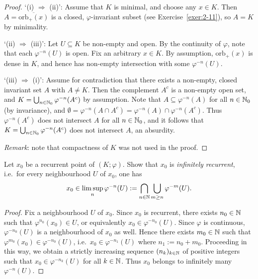 \begin{proof}
	`(i) $\Rightarrow$ (ii)': Assume that $K$ is minimal, and choose any $x\in K$. Then $A = \overline{\mathrm{orb}_+(x)}$ is a closed, $\varphi$-invariant subset (see Exercise~\ref{exer:2-11}), so $A=K$ by minimality.
	
	`(ii) $\Rightarrow$ (iii)': Let $U \subseteq K$ be non-empty and open. By the continuity of $\varphi$, note that each $\varphi^{-n}(U)$ is open. Fix an arbitrary $x\in K$. By assumption, $\mathrm{orb}_+(x)$ is dense in $K$, and hence has non-empty intersection with some $\varphi^{-n}(U)$.
	
	`(iii) $\Rightarrow$ (i)': Assume for contradiction that there exists a non-empty, closed invariant set $A$ with $A \ne K$. Then the complement $A^c$ is a non-empty open set, and $K = \bigcup_{n\in\mathbb{N}_0} \varphi^{-n}(A^c)$ by assumption. Note that $A \subseteq \varphi^{-n}(A)$ for all $n\in\mathbb{N}_0$ (by invariance), and $\emptyset = \varphi^{-n}(A \cap A^c) = \varphi^{-n}(A) \cap \varphi^{-n}(A^c)$. Thus $\varphi^{-n}(A^c)$ does not intersect $A$ for all $n\in\mathbb{N}_0$, and it follows that $K = \bigcup_{n\in\mathbb{N}_0} \varphi^{-n}(A^c)$ does not intersect $A$, an absurdity.
	
	\emph{Remark}: note that compactness of $K$ was not used in the proof.
\end{proof}

\begin{exercise}[Exercise 3.6]
	Let $x_0$ be a recurrent point of $(K;\varphi)$. Show that $x_0$ is \emph{infinitely recurrent}, i.e.\ for every neighbourhood $U$ of $x_0$, one has
	\begin{equation*}
		x_0 \in \limsup_n \varphi^{-n}(U) := \bigcap_{n\in\mathbb{N}} \bigcup_{m\ge n} \varphi^{-m}(U).
	\end{equation*}
\end{exercise}

\begin{proof}
	Fix a neighbourhood $U$ of $x_0$. Since $x_0$ is recurrent, there exists $n_0\in\mathbb{N}$ such that $\varphi^{n_0}(x_0) \in U$, or equivalently $x_0 \in \varphi^{-n_0}(U)$. Since $\varphi$ is continuous, $\varphi^{-n_0}(U)$ is a neighbourhood of $x_0$ as well. Hence there exists $m_0 \in \mathbb{N}$ such that $\varphi^{m_0}(x_0) \in \varphi^{-n_0}(U)$, i.e.\ $x_0 \in \varphi^{-n_1}(U)$ where $n_1 := n_0+m_0$. Proceeding in this way, we obtain a strictly increasing sequence $(n_k)_{k\in\mathbb{N}}$ of positive integers such that $x_0 \in \varphi^{-n_k}(U)$ for all $k\in\mathbb{N}$. Thus $x_0$ belongs to infinitely many $\varphi^{-n}(U)$.
\end{proof}


